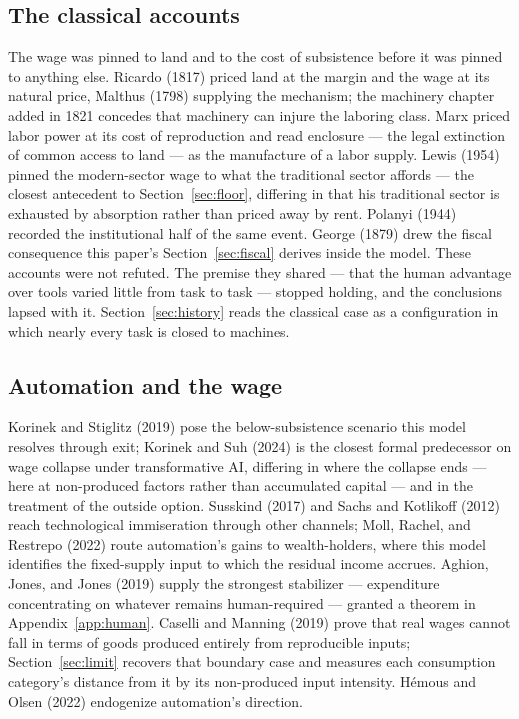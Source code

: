 \documentclass[12pt]{article}
\theoremstyle{plain}
\begin{document}
\subsection{The classical accounts}\label{sec:classical}

The wage was pinned to land and to the cost of subsistence before it was pinned to anything else. Ricardo (1817) priced land at the margin and the wage at its natural price, Malthus (1798) supplying the mechanism; the machinery chapter added in 1821 concedes that machinery can injure the laboring class. Marx priced labor power at its cost of reproduction and read enclosure --- the legal extinction of common access to land --- as the manufacture of a labor supply. Lewis (1954) pinned the modern-sector wage to what the traditional sector affords --- the closest antecedent to Section~\ref{sec:floor}, differing in that his traditional sector is exhausted by absorption rather than priced away by rent. Polanyi (1944) recorded the institutional half of the same event. George (1879) drew the fiscal consequence this paper's Section~\ref{sec:fiscal} derives inside the model. These accounts were not refuted. The premise they shared --- that the human advantage over tools varied little from task to task --- stopped holding, and the conclusions lapsed with it. Section~\ref{sec:history} reads the classical case as a configuration in
which nearly every task is closed to machines.

\subsection{Automation and the wage}\label{sec:automation}

Korinek and Stiglitz (2019) pose the below-subsistence scenario this model resolves through exit; Korinek and Suh (2024) is the closest formal predecessor on wage collapse under transformative AI, differing in where the collapse ends --- here at non-produced factors rather than accumulated capital --- and in the treatment of the outside option. Susskind (2017) and Sachs and Kotlikoff (2012) reach technological immiseration through other channels; Moll, Rachel, and Restrepo (2022) route automation's gains to wealth-holders, where this model identifies the fixed-supply input to which the residual income accrues. Aghion, Jones, and Jones (2019) supply the strongest stabilizer --- expenditure concentrating on whatever remains human-required --- granted a theorem in Appendix~\ref{app:human}. Caselli and Manning (2019) prove that real wages cannot fall in terms of goods produced entirely from reproducible inputs; Section~\ref{sec:limit} recovers that boundary case and measures each consumption category's distance from it by its non-produced input intensity. Hémous and Olsen (2022) endogenize automation's direction.
\end{document}
